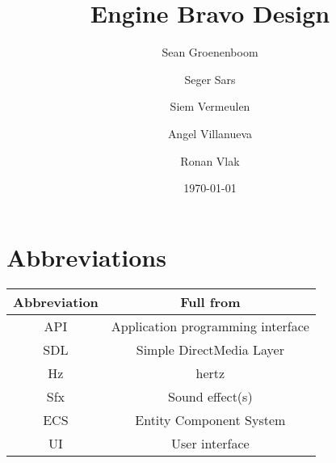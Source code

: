 \documentclass{article}
\title{Engine Bravo Design}
\author{Sean Groenenboom \and Seger Sars \and Siem Vermeulen \and Angel Villanueva \and Ronan Vlak} %
\date{\today}
\begin{document}
\maketitle %
\newpage

\tableofcontents
\newpage

\section{Abbreviations}
\begin{tabular}{c|c}
  \textbf{Abbreviation} & \textbf{Full from}                \\ \hline
  API                   & Application programming interface \\ \hline
  SDL                   & Simple DirectMedia Layer          \\ \hline
  Hz                    & hertz                             \\ \hline
  Sfx                   & Sound effect(s)                   \\ \hline
  ECS                   & Entity Component System           \\ \hline
  UI                    & User interface                    \\
\end{tabular}












\end{document}
